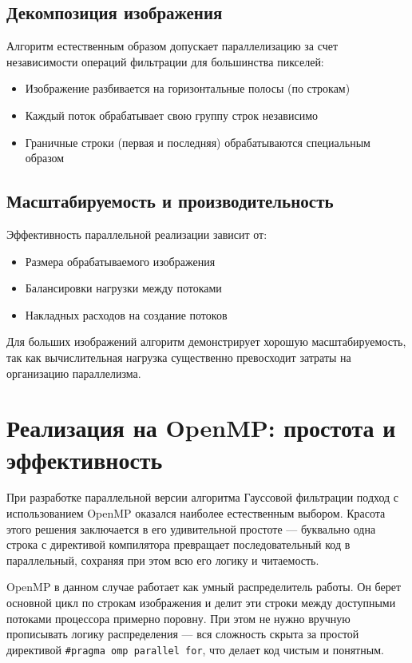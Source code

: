 \documentclass[a4paper,12pt]{article}
\begin{document}
\subsection*{Декомпозиция изображения}
Алгоритм естественным образом допускает параллелизацию за счет независимости операций фильтрации для большинства пикселей:
\begin{itemize}
    \item Изображение разбивается на горизонтальные полосы (по строкам)
    \item Каждый поток обрабатывает свою группу строк независимо
    \item Граничные строки (первая и последняя) обрабатываются специальным образом
\end{itemize}
\subsection*{Масштабируемость и производительность}
Эффективность параллельной реализации зависит от:
\begin{itemize}
    \item Размера обрабатываемого изображения
    \item Балансировки нагрузки между потоками
    \item Накладных расходов на создание потоков
\end{itemize}

Для больших изображений алгоритм демонстрирует хорошую масштабируемость, так как вычислительная нагрузка существенно превосходит затраты на организацию параллелизма.

\newpage

\section{Реализация на OpenMP: простота и эффективность}

При разработке параллельной версии алгоритма Гауссовой фильтрации подход с использованием OpenMP оказался наиболее естественным выбором. Красота этого решения заключается в его удивительной простоте — буквально одна строка с директивой компилятора превращает последовательный код в параллельный, сохраняя при этом всю его логику и читаемость.

OpenMP в данном случае работает как умный распределитель работы. Он берет основной цикл по строкам изображения и делит эти строки между доступными потоками процессора примерно поровну. При этом не нужно вручную прописывать логику распределения — вся сложность скрыта за простой директивой \texttt{\#pragma omp parallel for}, что делает код чистым и понятным.
\end{document}
